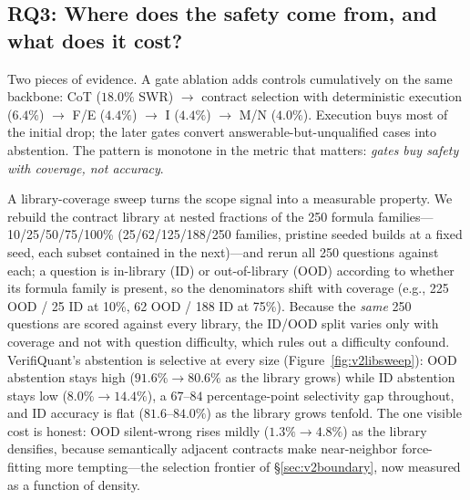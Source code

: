 \subsection*{RQ3: Where does the safety come from, and what does it cost?}
Two pieces of evidence.
A gate ablation adds controls cumulatively on the same backbone: CoT ($18.0\%$ SWR) $\rightarrow$ contract selection with deterministic execution ($6.4\%$) $\rightarrow$ F/E ($4.4\%$) $\rightarrow$ I ($4.4\%$) $\rightarrow$ M/N ($4.0\%$).
Execution buys most of the initial drop; the later gates convert answerable-but-unqualified cases into abstention.
The pattern is monotone in the metric that matters: \emph{gates buy safety with coverage, not accuracy}.

A library-coverage sweep turns the scope signal into a measurable property.
We rebuild the contract library at nested fractions of the 250 formula families---10/25/50/75/100\% (25/62/125/188/250 families, pristine seeded builds at a fixed seed, each subset contained in the next)---and rerun all 250 questions against each; a question is in-library (ID) or out-of-library (OOD) according to whether its formula family is present, so the denominators shift with coverage (e.g., 225 OOD / 25 ID at 10\%, 62 OOD / 188 ID at 75\%).
Because the \emph{same} 250 questions are scored against every library, the ID/OOD split varies only with coverage and not with question difficulty, which rules out a difficulty confound.
VerifiQuant's abstention is selective at every size (Figure~\ref{fig:v2libsweep}): OOD abstention stays high ($91.6\%{\to}80.6\%$ as the library grows) while ID abstention stays low ($8.0\%{\to}14.4\%$), a $67$--$84$ percentage-point selectivity gap throughout, and ID accuracy is flat ($81.6$--$84.0\%$) as the library grows tenfold.
The one visible cost is honest: OOD silent-wrong rises mildly ($1.3\%{\to}4.8\%$) as the library densifies, because semantically adjacent contracts make near-neighbor force-fitting more tempting---the selection frontier of \S\ref{sec:v2boundary}, now measured as a function of density.

